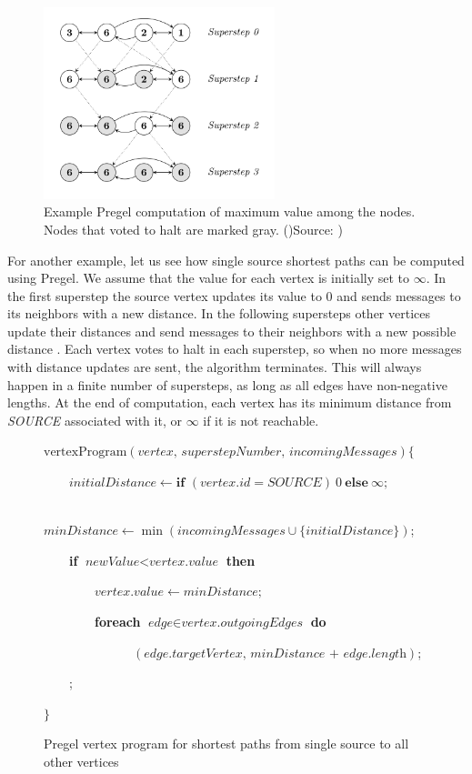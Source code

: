 \begin{figure}[h]
\begin{center}
\includegraphics[width=0.6\textwidth]{PregelMaxVal.png}
\caption{Example Pregel computation of maximum value among the nodes. Nodes that voted to halt are marked gray. ()Source: \cite{pregel})}
\end{center}\label{img:pregelmaxval}
\end{figure}

For another example, let us see how single source shortest paths can be computed using Pregel. 
We assume that the value for each vertex is initially set to $\infty$.
In the first superstep the source vertex updates its value to $0$ and sends messages to its neighbors with a new distance. In the following supersteps
other vertices update their distances and send messages to their neighbors with a new possible distance . Each vertex votes to halt in each superstep, so when no more messages with distance updates are sent, the algorithm terminates. This will always happen in a finite number of supersteps, as long as all edges have non-negative lengths. At the end of computation, each vertex has its minimum distance from \textit{SOURCE} associated with it, or $\infty$ if it is not reachable.

\begin{figure}[h!]
\parbox{0.8\textwidth}{
$\text{vertexProgram}(\textit{vertex, superstepNumber, incomingMessages}) \{$

~~~~$\textit{initialDistance} \leftarrow \textbf{if }(vertex.id = SOURCE)~0~\textbf{else}~\infty;$

~~~~$\textit{minDistance} \leftarrow \min(\textit{incomingMessages} \cup \{\textit{initialDistance}\})$;

~~~~\textbf{if} $\textit{newValue} < \textit{vertex.value}$ \textbf{then}

~~~~~~~~$\textit{vertex.value} \leftarrow \textit{minDistance};$

~~~~~~~~\textbf{foreach} $\textit{edge} \in \textit{vertex.outgoingEdges}$ \textbf{do}

~~~~~~~~~~~~~~$(\textit{edge.targetVertex, minDistance + edge.length})$;

~~~~;

$\}$
}

\caption{Pregel vertex program for shortest paths from single source to all other vertices}
\end{figure}


